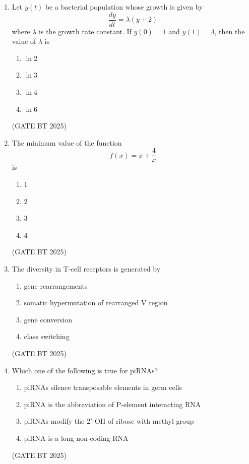 \documentclass[journal,12pt,onecolumn]{IEEEtran}
\theoremstyle{remark}
\begin{document}
\begin{enumerate}
\item Let $y(t)$ be a bacterial population whose growth is given by  
\[
\frac{dy}{dt} = \lambda (y + 2)
\]  
where $\lambda$ is the growth rate constant. If $y(0) = 1$ and $y(1) = 4$, then the value of $\lambda$ is  
\begin{multicols}{2}
\begin{enumerate}
    \item $\ln 2$
    \item $\ln 3$
    \item $\ln 4$
    \item $\ln 6$
\end{enumerate}
\end{multicols}
\hfill (GATE BT 2025)

\item The minimum value of the function  
\[
f(x) = x + \frac{4}{x} 
\]  
is  
\begin{multicols}{2}
\begin{enumerate}
    \item $1$
    \item $2$
    \item $3$
    \item $4$
\end{enumerate}
\end{multicols}
\hfill (GATE BT 2025)

\item The diversity in T-cell receptors is generated by  

\begin{enumerate}
    \item gene rearrangements
    \item somatic hypermutation of rearranged V region
    \item gene conversion
    \item class switching
\end{enumerate}  
\hfill (GATE BT 2025)

\item Which one of the following is true for piRNAs?  

\begin{enumerate}
    \item piRNAs silence transposable elements in germ cells
    \item piRNA is the abbreviation of P-element interacting RNA
    \item piRNAs modify the $2'$-OH of ribose with methyl group
    \item piRNA is a long non-coding RNA
\end{enumerate}  
\hfill (GATE BT 2025)


\end{enumerate}
\end{document}
